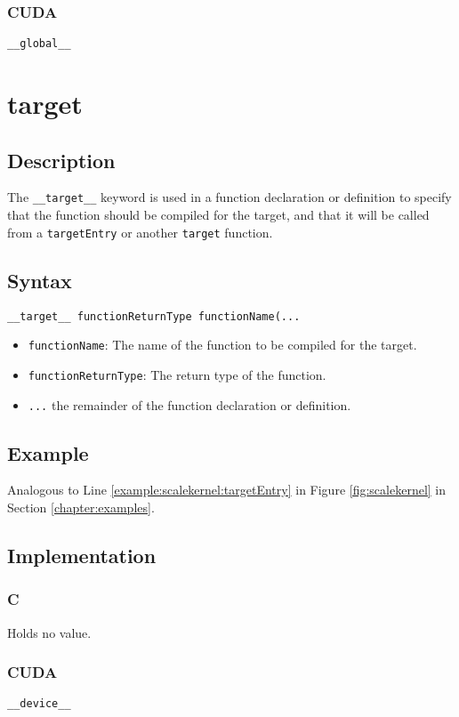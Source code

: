 \subsubsection{CUDA}
\verb+__global__+

\newpage
\section{target}
\subsection{Description}

The \verb+__target__+ keyword is used in a function declaration
or definition to specify that the function should be compiled for the
target, and that it will be called from a \verb+targetEntry+ or another \verb+target+ function.

\subsection{Syntax}
\begin{verbatim}
__target__ functionReturnType functionName(...
\end{verbatim}

\begin{itemize}
\item \verb+functionName+: The name of the function to be compiled for the target.
\item \verb+functionReturnType+: The return type of the function.
\item \verb+...+ the remainder of the function declaration or definition.
\end{itemize}


\subsection{Example}
Analogous to Line \ref{example:scalekernel:targetEntry} in Figure \ref{fig:scalekernel} in Section \ref{chapter:examples}.

\subsection{Implementation}
\subsubsection{C}
Holds no value.
\subsubsection{CUDA}
\verb+__device__+


